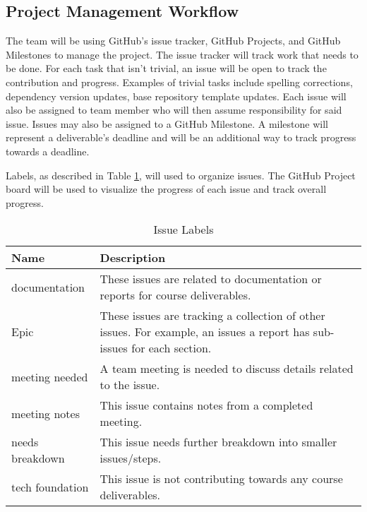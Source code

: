 \documentclass{article}
\begin{document}
\subsection{Project Management Workflow}

The team will be using GitHub's issue tracker, GitHub Projects, and GitHub Milestones to manage the
project. The issue tracker will track work that needs to be done. For each task that isn't trivial,
an issue will be open to track the contribution and progress. Examples of trivial tasks include
spelling corrections, dependency version updates, base repository template updates. Each issue will
also be assigned to team member who will then assume responsibility for said issue. Issues may also
be assigned to a GitHub Milestone. A milestone will represent a deliverable's deadline and will be
an additional way to track progress towards a deadline.

Labels, as described in Table \ref{issueLabels}, will used to organize issues. The GitHub Project
board will be used to visualize the progress of each issue and track overall progress.

\begin{table}[H]
	\centering
	\caption{Issue Labels}
	\vspace{5pt}
	\begin{tabular}{|p{}|p{}|}
		\hline
		\textbf{Name}   & \textbf{Description}                                                                    \\
		\hline
		documentation   & These issues are related to documentation or reports for course deliverables.           \\
		\hline
		Epic            & These issues are tracking a collection of other issues. For example, an issues a report
		has sub-issues for each section.                                                                          \\
		\hline
		meeting needed  & A team meeting is needed to discuss details related to the issue.                       \\
		\hline
		meeting notes   & This issue contains notes from a completed meeting.                                     \\
		\hline
		needs breakdown & This issue needs further breakdown into smaller issues/steps.                           \\
		\hline
		tech foundation & This issue is not contributing towards any course deliverables.                         \\
		\hline
	\end{tabular}

	\label{issueLabels}
\end{table}
\end{document}
